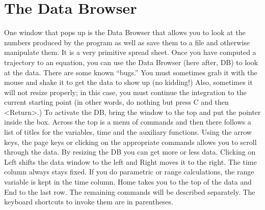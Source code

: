 \documentclass{article}
\begin{document}
\section{The Data Browser}
One window that pops up is the Data Browser that allows you to look at
the numbers produced by the program as well as save them to a file and
otherwise manipulate them.  It is a very primitive spread sheet.  Once
you have computed a trajectory to an equation, you can use the Data
Browser (here after, DB) to look at the data. There are some known
``bugs.'' You must sometimes grab it with the mouse and shake it to
get the data to show up (no kidding!) Also, sometimes it will not
resize properly; in this case, you must continue the integration to
the current starting point (in other words, do nothing but press C and
then <Return>.) To activate the DB, bring the window to the top and
put the pointer inside the box.  Across the top is a menu of commands
and then there follows a list of titles for the variables, time and
the auxiliary functions. Using the arrow keys, the page keys or
clicking on the appropriate commands allows you to scroll through the
data. By resizing the DB you can get more or less data.  Clicking on
Left shifts the data window to the left and Right moves it to the
right.  The time column always stays fixed.  If you do parametric or
range calculations, the range variable is kept in the time column.
Home takes you to the top of the data and End to the last row.  The
remaining commands will be described separately. The keyboard
shortcuts to invoke them are in parentheses.
\end{document}
